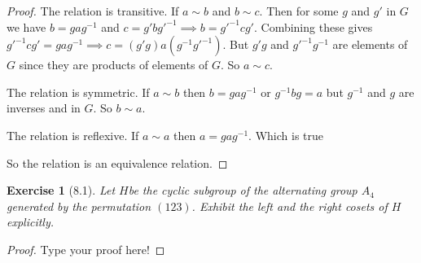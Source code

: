 \documentclass[12pt,leqno]{article}
\numberwithin{equation}{section}
\newtheorem*{exer}{Exercise}
\theoremstyle{definition}
\begin{document}
\begin{proof}[Proof]

    The relation is transitive. If $a \sim b$ and $b \sim c$. Then for some $g$
    and $g'$ in $G$ we have $b = gag^{-1}$ and $c = g'bg'^{-1} \implies b =
    g'^{-1}cg'$. Combining these gives $g'^{-1}cg' = gag^{-1} \implies c =
    (g'g)a(g^{-1}g'^{-1})$. But $g'g$ and $g'^{-1}g^{-1}$ are elements of $G$
    since they are products of elements of $G$. So $a \sim c$.

    The relation is symmetric. If $a \sim b$ then $b = gag^{-1}$ or $g^{-1}bg =
    a$ but $g^{-1}$ and $g$ are inverses and in $G$. So $b \sim a$.

    The relation is reflexive. If $a \sim a$ then $a = gag^{-1}$. Which is true

    So the relation is an equivalence relation.

\end{proof}


\begin{exer}[8.1]
Let $H$be the cyclic subgroup of the alternating group $A_4$ generated by the permutation $(1 2 3)$. Exhibit the left and the right cosets of $H$ explicitly.
\end{exer}

\begin{proof}[Proof]
Type your proof here!
\end{proof}
\end{document}
